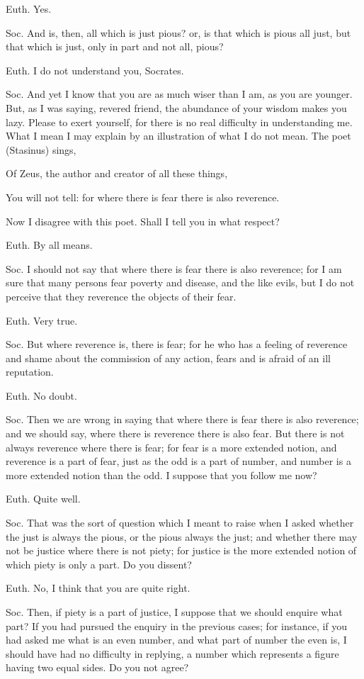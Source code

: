 Euth. Yes.

Soc. And is, then, all which is just pious? or, is that which is pious all just, but that which is just, only in part and not all, pious?

Euth. I do not understand you, Socrates.

Soc. And yet I know that you are as much wiser than I am, as you are younger. But, as I was saying, revered friend, the abundance of your wisdom makes you lazy. Please to exert yourself, for there is no real difficulty in understanding me. What I mean I may explain by an illustration of what I do not mean. The poet (Stasinus) sings,

Of Zeus, the author and creator of all these things,

You will not tell: for where there is fear there is also reverence.

Now I disagree with this poet. Shall I tell you in what respect?

Euth. By all means.

Soc. I should not say that where there is fear there is also reverence; for I am sure that many persons fear poverty and disease, and the like evils, but I do not perceive that they reverence the objects of their fear.

Euth. Very true.

Soc. But where reverence is, there is fear; for he who has a feeling of reverence and shame about the commission of any action, fears and is afraid of an ill reputation.

Euth. No doubt.

Soc. Then we are wrong in saying that where there is fear there is also reverence; and we should say, where there is reverence there is also fear. But there is not always reverence where there is fear; for fear is a more extended notion, and reverence is a part of fear, just as the odd is a part of number, and number is a more extended notion than the odd. I suppose that you follow me now?

Euth. Quite well.

Soc. That was the sort of question which I meant to raise when I asked whether the just is always the pious, or the pious always the just; and whether there may not be justice where there is not piety; for justice is the more extended notion of which piety is only a part. Do you dissent?

Euth. No, I think that you are quite right.

Soc. Then, if piety is a part of justice, I suppose that we should enquire what part? If you had pursued the enquiry in the previous cases; for instance, if you had asked me what is an even number, and what part of number the even is, I should have had no difficulty in replying, a number which represents a figure having two equal sides. Do you not agree?

